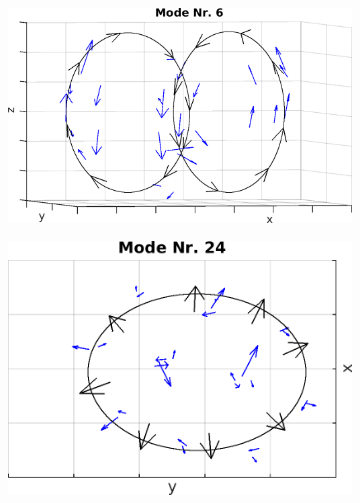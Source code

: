             \begin{figure}[!t]
              \centering
              \begin{subfigure}[t]{0.325\textwidth}
                \centering
                \includegraphics[width=\textwidth,height=0.8\textwidth]{figs/auswertung/manipulation/quadrupol1HzModeNr6.png}
              \end{subfigure}
              \begin{subfigure}[t]{0.325\textwidth}
                \centering
                \includegraphics[width=\textwidth,height=0.8\textwidth]{figs/auswertung/manipulation/quadrupol1HzModeNr24.png}

\end{subfigure}
\end{figure}
